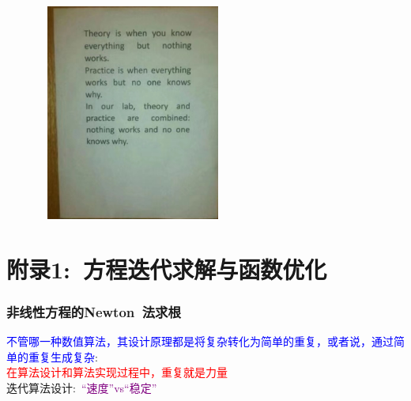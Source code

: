 \documentclass[cjk,slidestop,compress,mathserif,blue]{beamer}
\begin{document}
\frame
{
\begin{figure}[h!]
\vskip -5pt
\centering
\includegraphics[height=2.8in,width=2.5in,viewport=110 225 505 660,clip]{Figures/Theory_Practice.jpg}
\label{Theory_Practice}
\end{figure}
}

\section{附录1:~方程迭代求解与函数优化}
\frame
{
	\frametitle{非线性方程的\rm{Newton~}法求根}
	\textcolor{blue}{不管哪一种数值算法，其设计原理都是将复杂转化为简单的重复，或者说，通过简单的重复生成复杂}:\\
	\textcolor{red}{在算法设计和算法实现过程中，重复就是力量}\\
迭代算法设计:~\textcolor{purple}{“速度”\textrm{vs}“稳定”}
\begin{figure}[h!]
\centering
{}
\label{Equation_Newon}
\end{figure}
}
\end{document}
